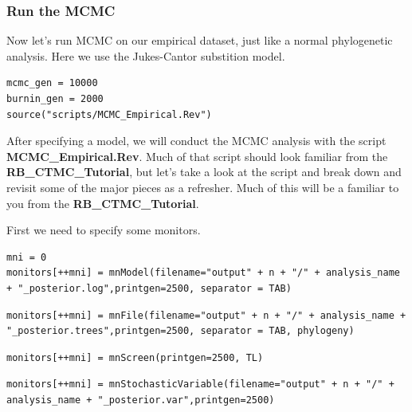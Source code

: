 \subsubsection{Run the MCMC}

Now let's run MCMC on our empirical dataset, just like
a normal phylogenetic analysis. Here we use the Jukes-Cantor
substition model.
{\tt \begin{Snugshade}[184,207,236]
\begin{lstlisting}
mcmc_gen = 10000
burnin_gen = 2000
source("scripts/MCMC_Empirical.Rev")
\end{lstlisting}
\end{Snugshade}}


After specifying a model, we will conduct the MCMC analysis with the script  \textbf{MCMC\_Empirical.Rev}. 
Much of that script should look familiar from the \textbf{RB\_CTMC\_Tutorial}, but let's take a look at 
the script and break down and revisit some of the major pieces as a refresher. Much of this will be a 
familiar to you from the \textbf{RB\_CTMC\_Tutorial}. 


First we need to specify some monitors. 
{\tt \begin{Snugshade}[184,207,236]
\begin{lstlisting}
mni = 0
monitors[++mni] = mnModel(filename="output" + n + "/" + analysis_name + "_posterior.log",printgen=2500, separator = TAB)
\end{lstlisting}
\end{Snugshade}}
{\tt \begin{Snugshade}[184,207,236]
\begin{lstlisting}
monitors[++mni] = mnFile(filename="output" + n + "/" + analysis_name + "_posterior.trees",printgen=2500, separator = TAB, phylogeny)
\end{lstlisting}
\end{Snugshade}}
{\tt \begin{Snugshade}[184,207,236]
\begin{lstlisting}
monitors[++mni] = mnScreen(printgen=2500, TL)
\end{lstlisting}
\end{Snugshade}}
{\tt \begin{Snugshade}[184,207,236]
\begin{lstlisting}
monitors[++mni] = mnStochasticVariable(filename="output" + n + "/" + analysis_name + "_posterior.var",printgen=2500)
\end{lstlisting}
\end{Snugshade}}


